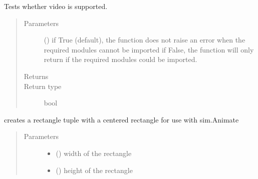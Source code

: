 \documentclass[letterpaper,10pt,english]{sphinxmanual}
\begin{document}
\begin{fulllineitems}
\label{\detokenize{Reference:salabim.can_video}}
Tests whether video is supported.
\begin{quote}\begin{description}
\item[{Parameters}] \leavevmode
{} () \textendash{} if True (default), the function does not raise an error when the required modules cannot be imported 
if False, the function will only return if the required modules could be imported.

\item[{Returns}] \leavevmode
{}

\item[{Return type}] \leavevmode
bool

\end{description}\end{quote}

\end{fulllineitems}


\begin{fulllineitems}
\label{\detokenize{Reference:salabim.centered_rectangle}}
creates a rectangle tuple with a centered rectangle for use with sim.Animate
\begin{quote}\begin{description}
\item[{Parameters}] \leavevmode\begin{itemize}
\item {} 
 () \textendash{} width of the rectangle

\item {} 
 () \textendash{} height of the rectangle

\end{itemize}

\end{description}\end{quote}

\end{fulllineitems}
\end{document}
